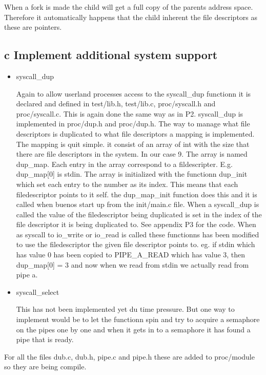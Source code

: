 \documentclass[a4paper,12pt,danish]{report}
\begin{document}
\begin{itemize}
  	When a fork is made the child will get a full copy of the parents address
  	space. Therefore it automatically happens that the child inherent the file
  	descriptors as these are pointers.
\end{itemize}
\subsection{c Implement additional system support}
\begin{itemize}
  \item{syscall\_dup}

  Again to allow userland processes access to the syscall\_dup functionn it is
  declared and defined in test/lib.h, test/lib.c, proc/syscall.h and proc/syscall.c.
  This is again done the same way as in P2. syscall\_dup is implemented in
  proc/dup.h and proc/dup.h. The way to manage what file descriptors is
  duplicated to what file descriptors a mapping is implemented. The mapping is quit simple. it
  consist of an array of int with the size that there are file descriptors in
  the system. In our case 9. The array is named dup\_map. Each entry in the
  array correspond to a fildescripter. E.g. dup\_map[0] is stdin. The array is
  initialized with the functionn dup\_init which set each entry to the
  number as its index. This means that each filedescriptor points to it self.
  the dup\_map\_init function does this and it is called when buenos start up
  from the init/main.c file. When a syscall\_dup is called the value of the
  filedescriptor being duplicated is set in the index of the file descriptor it is
  being duplicated to. See appendix P3 for the code. When as syscall to
  io\_write or io\_read is called these functionns has been modified to use the
  filedescriptor the given file descriptor points to. eg. if stdin which has
  value 0 has been copied to PIPE\_A\_READ which has value 3, then dup\_map[0] =
  3 and now when we read from stdin we actually read from pipe a.

  \item{syscall\_select}

  This has not been implemented yet du time pressure.  But one way to implement
  would be to let the functionn spin and try to acquire a semaphore on the pipes
  one by one and when it gets in to a semaphore it has found a pipe that is
  ready.
\end{itemize}

For all the files dub.c, dub.h, pipe.c and pipe.h these are added to proc/module
so they are being compile.
\end{document}
